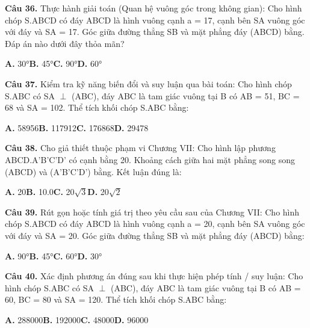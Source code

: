 \documentclass[11pt,a4paper]{article}
\begin{document}
\textbf{\color{primary} Câu 36.} Thực hành giải toán (Quan hệ vuông góc trong không gian): Cho hình chóp S.ABCD có đáy ABCD là hình vuông cạnh a = 17, cạnh bên SA vuông góc với đáy và SA = 17. Góc giữa đường thẳng SB và mặt phẳng đáy (ABCD) bằng. Đáp án nào dưới đây thỏa mãn?\par
\hspace*{1.5em}\textbf{A.} 30°\quad\quad \textbf{B.} 45°\quad\quad \textbf{C.} 90°\quad\quad \textbf{D.} 60°\par\vspace{2pt}
\textbf{\color{primary} Câu 37.} Kiểm tra kỹ năng biến đổi và suy luận qua bài toán: Cho hình chóp S.ABC có SA $\perp$ (ABC), đáy ABC là tam giác vuông tại B có AB = 51, BC = 68 và SA = 102. Thể tích khối chóp S.ABC bằng:\par
\hspace*{1.5em}\textbf{A.} 58956\quad\quad \textbf{B.} 117912\quad\quad \textbf{C.} 176868\quad\quad \textbf{D.} 29478\par\vspace{2pt}
\textbf{\color{primary} Câu 38.} Cho giả thiết thuộc phạm vi Chương VII: Cho hình lập phương ABCD.A'B'C'D' có cạnh bằng 20. Khoảng cách giữa hai mặt phẳng song song (ABCD) và (A'B'C'D') bằng. Kết luận đúng là:\par
\hspace*{1.5em}\textbf{A.} 20\quad\quad \textbf{B.} 10.0\quad\quad \textbf{C.} 20$\sqrt{3}$\quad\quad \textbf{D.} 20$\sqrt{2}$\par\vspace{2pt}
\textbf{\color{primary} Câu 39.} Rút gọn hoặc tính giá trị theo yêu cầu sau của Chương VII: Cho hình chóp S.ABCD có đáy ABCD là hình vuông cạnh a = 20, cạnh bên SA vuông góc với đáy và SA = 20. Góc giữa đường thẳng SB và mặt phẳng đáy (ABCD) bằng:\par
\hspace*{1.5em}\textbf{A.} 90°\quad\quad \textbf{B.} 45°\quad\quad \textbf{C.} 60°\quad\quad \textbf{D.} 30°\par\vspace{2pt}
\textbf{\color{primary} Câu 40.} Xác định phương án đúng sau khi thực hiện phép tính / suy luận: Cho hình chóp S.ABC có SA $\perp$ (ABC), đáy ABC là tam giác vuông tại B có AB = 60, BC = 80 và SA = 120. Thể tích khối chóp S.ABC bằng:\par
\hspace*{1.5em}\textbf{A.} 288000\quad\quad \textbf{B.} 192000\quad\quad \textbf{C.} 48000\quad\quad \textbf{D.} 96000\par\vspace{2pt}
\end{document}
